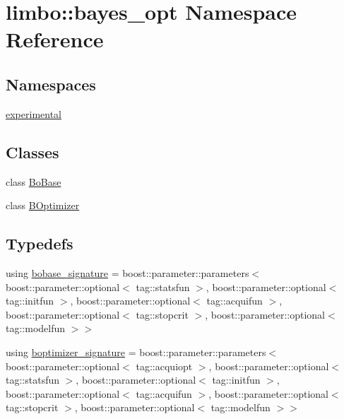 \hypertarget{namespacelimbo_1_1bayes__opt}{}\section{limbo\+:\+:bayes\+\_\+opt Namespace Reference}
\label{namespacelimbo_1_1bayes__opt}
\subsection*{Namespaces}
\begin{DoxyCompactItemize}
\item 
 \hyperlink{namespacelimbo_1_1bayes__opt_1_1experimental}{experimental}
\end{DoxyCompactItemize}
\subsection*{Classes}
\begin{DoxyCompactItemize}
\item 
class \hyperlink{classlimbo_1_1bayes__opt_1_1_bo_base}{Bo\+Base}
\item 
class \hyperlink{classlimbo_1_1bayes__opt_1_1_b_optimizer}{B\+Optimizer}
\end{DoxyCompactItemize}
\subsection*{Typedefs}
\begin{DoxyCompactItemize}
\item 
using \hyperlink{namespacelimbo_1_1bayes__opt_a824303857a6912240f23e422927773f7}{bobase\+\_\+signature} = boost\+::parameter\+::parameters$<$ boost\+::parameter\+::optional$<$ tag\+::statsfun $>$, boost\+::parameter\+::optional$<$ tag\+::initfun $>$, boost\+::parameter\+::optional$<$ tag\+::acquifun $>$, boost\+::parameter\+::optional$<$ tag\+::stopcrit $>$, boost\+::parameter\+::optional$<$ tag\+::modelfun $>$$>$
\item 
using \hyperlink{namespacelimbo_1_1bayes__opt_a6f7eddef5a0de80d03fe4df398480997}{boptimizer\+\_\+signature} = boost\+::parameter\+::parameters$<$ boost\+::parameter\+::optional$<$ tag\+::acquiopt $>$, boost\+::parameter\+::optional$<$ tag\+::statsfun $>$, boost\+::parameter\+::optional$<$ tag\+::initfun $>$, boost\+::parameter\+::optional$<$ tag\+::acquifun $>$, boost\+::parameter\+::optional$<$ tag\+::stopcrit $>$, boost\+::parameter\+::optional$<$ tag\+::modelfun $>$$>$
\end{DoxyCompactItemize}


